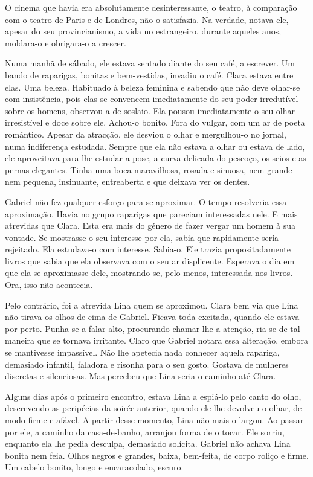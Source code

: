 O cinema que havia era absolutamente desinteressante, o teatro, à
comparação com o teatro de Paris e de Londres, não o satisfazia. Na
verdade, notava ele, apesar do seu provincianismo, a vida no
estrangeiro, durante aqueles anos, moldara-o e obrigara-o a crescer.

Numa manhã de sábado, ele estava sentado diante do seu café, a escrever.
Um bando de raparigas, bonitas e bem-vestidas, invadiu o café. Clara
estava entre elas. Uma beleza. Habituado à beleza feminina e sabendo que
não deve olhar-se com insistência, pois elas se convencem imediatamente
do seu poder irredutível sobre os homens, observou-a de soslaio. Ela
pousou imediatamente o seu olhar irresistível e doce sobre ele. Achou-o
bonito. Fora do vulgar, com um ar de poeta romântico. Apesar da
atracção, ele desviou o olhar e mergulhou-o no jornal, numa indiferença
estudada. Sempre que ela não estava a olhar ou estava de lado, ele
aproveitava para lhe estudar a pose, a curva delicada do pescoço, os
seios e as pernas elegantes. Tinha uma boca maravilhosa, rosada e
sinuosa, nem grande nem pequena, insinuante, entreaberta e que deixava
ver os dentes.

Gabriel não fez qualquer esforço para se aproximar. O tempo resolveria
essa aproximação. Havia no grupo raparigas que pareciam interessadas
nele. E mais atrevidas que Clara. Esta era mais do género de fazer
vergar um homem à sua vontade. Se mostrasse o seu interesse por ela,
sabia que rapidamente seria rejeitado. Ela estudava-o com interesse.
Sabia-o. Ele trazia propositadamente livros que sabia que ela observava
com o seu ar displicente. Esperava o dia em que ela se aproximasse dele,
mostrando-se, pelo menos, interessada nos livros. Ora, isso não
acontecia.

Pelo contrário, foi a atrevida Lina quem se aproximou. Clara bem via que
Lina não tirava os olhos de cima de Gabriel. Ficava toda excitada,
quando ele estava por perto. Punha-se a falar alto, procurando
chamar-lhe a atenção, ria-se de tal maneira que se tornava irritante.
Claro que Gabriel notara essa alteração, embora se mantivesse
impassível. Não lhe apetecia nada conhecer aquela rapariga, demasiado
infantil, faladora e risonha para o seu gosto. Gostava de mulheres
discretas e silenciosas. Mas percebeu que Lina seria o caminho até
Clara.

Alguns dias após o primeiro encontro, estava Lina a espiá-lo pelo canto
do olho, descrevendo as peripécias da soirée anterior, quando ele lhe
devolveu o olhar, de modo firme e afável. A partir desse momento, Lina
não mais o largou. Ao passar por ele, a caminho da casa-de-banho,
arranjou forma de o tocar. Ele sorriu, enquanto ela lhe pedia desculpa,
demasiado solícita. Gabriel não achava Lina bonita nem feia. Olhos
negros e grandes, baixa, bem-feita, de corpo roliço e firme. Um cabelo
bonito, longo e encaracolado, escuro.

